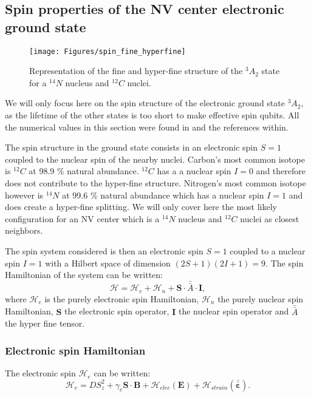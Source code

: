 \documentclass[a4paper,11pt]{report}
\begin{document}
\subsection{Spin properties of the NV center electronic ground state}
\begin{figure}[h!]
\centering
\texttt{[image: Figures/spin\_fine\_hyperfine]}
\caption{Representation of the fine and hyper-fine structure of the $^3A_2$ state for a $^{14}N$ nucleus and $^{12}C$ nuclei.}
\label{NV spin}
\end{figure}

We will only focus here on the spin structure of the electronic ground state $^3A_2$, as the lifetime of the other states is too short to make effective spin qubits. All the numerical values in this section were found in \citep{smeltzer2009robust, doherty2013nitrogen} and the references within.

The spin structure in the ground state consists in an electronic spin $S=1$ coupled to the nuclear spin of the nearby nuclei. Carbon's most common isotope is $^{12}C$ at 98.9 \% natural abundance. $^{12}C$ has a a nuclear spin $I=0$ and therefore does not contribute to the hyper-fine structure. Nitrogen's most common isotope however is $^{14}N$ at 99.6 \% natural abundance which has a nuclear spin $I=1$ and does create a hyper-fine splitting. We will only cover here the most likely configuration for an NV center which is a $^{14}N$ nucleus and $^{12}C$ nuclei as closest neighbors. 

The spin system considered is then an electronic spin $S=1$ coupled to a nuclear spin $I=1$ with a Hilbert space of dimension $(2S+1)(2I+1)=9$. The spin Hamiltonian of the system can be written:
\begin{equation}
\mathcal{H}=\mathcal{H}_e + \mathcal{H}_n + \mathbf{S}\cdot \bar{\bar{A}}\cdot \mathbf{I},
\end{equation}
where $\mathcal{H}_e$ is the purely electronic spin Hamiltonian, $\mathcal{H}_n$ the purely nuclear spin Hamiltonian, $\mathbf{S}$ the electronic spin operator, $\mathbf{I}$ the nuclear spin operator and $\bar{\bar{A}}$ the hyper fine tensor.
\subsubsection{Electronic spin Hamiltonian}
The electronic spin $\mathcal{H}_e$ can be written:
\begin{equation}
\label{eq. spin elec}
\mathcal{H}_e=D S_z^2 + \gamma_e \mathbf{S} \cdot \mathbf{B} + \mathcal{H}_{elec}(\mathbf{E})+ \mathcal{H}_{strain}(\mathbf{\bar{\bar{\varepsilon}}}).
\end{equation}
\end{document}
